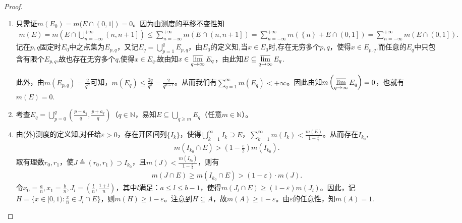 \documentclass[../../main.tex]{subfiles}%
\begin{document}
\begin{proof}
\begin{enumerate}[(1)]
\item 只需证$m(E_0)=m(E\cap(0,1])=0$。因为由\hyperref[theorem:外测度的平移不变性]{测度的平移不变性}知
\begin{align*}
m\left( E \right) =m\left( E\cap \bigcup_{n=-\infty}^{+\infty}{\left( n,n+1 \right]} \right) \leqslant \sum_{n=-\infty}^{+\infty}{m\left( E\cap \left( n,n+1 \right] \right)}=\sum_{n=-\infty}^{+\infty}{m\left( \left\{ n \right\} +E\cap \left( 0,1 \right] \right)}=\sum_{n=-\infty}^{+\infty}{m\left( E\cap \left( 0,1 \right] \right)}.
\end{align*}
记在$p,q$固定时$E_0$中之点集为$E_{p,q}$，又记$E_q=\bigcup\limits_{p=1}^{q}E_{p,q}$，由$E_0$的定义知,当$x\in E_0$时,存在无穷多个$p,q$，使得$x\in E_{p,q}$.而任意的$E_q$中只包含有限个$E_{p,q}$,故也存在无穷多个$q$,使得$x\in E_q$.故由知$x\in\varlimsup\limits_{q\to\infty}E_q$，由此知$E\subseteq\varlimsup\limits_{q\to\infty}E_q$.

此外，由$m(E_{p,q})=\frac{2}{q^{\alpha}}$可知，$m(E_q)\leqslant \frac{2q}{q^\alpha}=\frac{2}{q^{\alpha-1}}$。从而我们有$\sum\limits_{q=1}^{\infty}m(E_q)<+\infty$。因此由知$m\left(\varlimsup\limits_{q\to\infty}E_q\right)=0$，也就有$m(E)=0$.

\item 考查$E_q=\bigcup\limits_{p=0}^{q}(\frac{p-a_q}{q},\frac{p+a_q}{q})$（$q\in\mathbb{N}$，易知$E\subseteq\bigcup\limits_{q\geqslant m}E_q$（任意$m\in\mathbb{N}$）。
\end{enumerate}
\begin{enumerate}[(1)]
\setcounter{enumi}{3}
\item 由(外)测度的定义知,对任给$\varepsilon>0$，存在开区间列$\{I_k\}$，使得$\bigcup\limits_{k=1}^{\infty}I_k\supseteq E$，$\sum\limits_{k=1}^{\infty}m(I_k)<\frac{m\left( E \right)}{1-\frac{\varepsilon}{2}}$。从而存在$I_{k_0}$,
\begin{align*}
m(I_{k_0}\cap E)>(1-\frac{\varepsilon}{2})m(I_{k_0}).
\end{align*}
取有理数$r_0,r_1$，使$J\triangleq(r_0,r_1)\supset I_{k_0}$，且$m(J)<\frac{m\left( I_{k_0} \right)}{1-\frac{\varepsilon}{2}}$，则有
\begin{align*}
m(J\cap E)\geqslant m(I_{k_0}\cap E)>(1-\varepsilon)\cdot m(J).
\end{align*}
令$x_0=\frac{a}{n},x_1=\frac{b}{n},J_l=(\frac{l}{n},\frac{1+l}{n})$，其中$l$满足：$a\leqslant l\leqslant b-1$，使得$m(J_l\cap E)\geqslant(1-\varepsilon)m(J_l)$。因此，记$H=\{x\in[0,1):\frac{x}{n}\in J_l\cap E\}$，则$m(H)\geqslant1-\varepsilon$。注意到$H\subseteq A$，故$m(A)\geqslant1-\varepsilon$。由$\varepsilon$的任意性，知$m(A)=1$.
\end{enumerate}

\end{proof}
\end{document}
